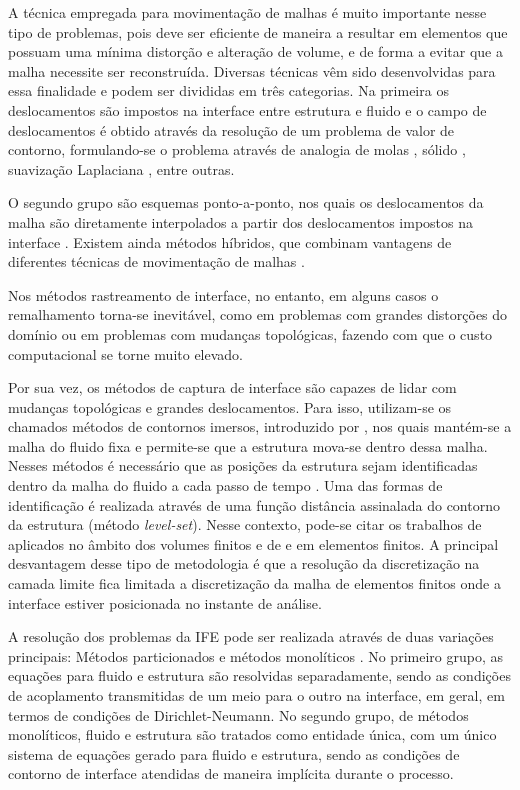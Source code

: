 \documentclass[tese_patricia.tex]{subfiles}
\begin{document}
A técnica empregada para movimentação de malhas é muito importante nesse tipo de problemas, pois deve ser eficiente de maneira a resultar em elementos que possuam uma mínima distorção e alteração de volume, e de forma a evitar que a malha necessite ser reconstruída. Diversas técnicas vêm sido desenvolvidas para essa finalidade e podem ser divididas em três categorias. Na primeira os deslocamentos são impostos na interface entre estrutura e fluido e o campo de deslocamentos é obtido através da resolução de um problema de valor de contorno, formulando-se o problema através de analogia de molas \cite{BottassoDS:2005}, sólido \cite{JohnsonT:1994,SteinTB:2004}, suavização Laplaciana \cite{KanchiM:2007}, entre outras.

O segundo grupo são esquemas ponto-a-ponto, nos quais os deslocamentos da malha são diretamente interpolados a partir dos deslocamentos impostos na interface \cite{DoneaGH:1982,TezduyarABJ:1993,SanchesC:2014}. Existem ainda métodos híbridos, que combinam vantagens de diferentes técnicas de movimentação de malhas \cite{Lefrancois:2008,FernandesCS:2019}. 

Nos métodos rastreamento de interface, no entanto, em alguns casos o remalhamento torna-se inevitável, como em problemas com grandes distorções do domínio ou em problemas com mudanças topológicas, fazendo com que o custo computacional se torne muito elevado.

Por sua vez, os métodos de captura de interface são capazes de lidar com mudanças topológicas e grandes deslocamentos. Para isso, utilizam-se os chamados métodos de contornos imersos, introduzido por , nos quais mantém-se a malha do fluido fixa e permite-se que a estrutura mova-se dentro dessa malha. Nesses métodos é necessário que as posições da estrutura sejam identificadas dentro da malha do fluido a cada passo de tempo \cite{MittalI:2005,WangRGF:2011}. Uma das formas de identificação é realizada através de uma função distância assinalada do contorno da estrutura (método \textit{level-set}). Nesse contexto, pode-se citar os trabalhos de   aplicados no âmbito dos volumes finitos e de  e  em elementos finitos. A principal desvantagem desse tipo de metodologia é que a resolução da discretização na camada limite fica limitada a discretização da malha de elementos finitos onde a interface estiver posicionada no instante de análise.

A resolução dos problemas da IFE pode ser realizada através de duas variações principais: Métodos particionados \cite{RouxG:2009,BazilevsHKWB:2011, SanchesC:2013,SanchesC:2014,FernandesCS:2019} e métodos monolíticos \cite{Blom:1998,Hubneretal:2004,HronM:2007,Avancini:2023}. No primeiro grupo, as equações para fluido e estrutura são resolvidas separadamente, sendo as condições de acoplamento transmitidas de um meio para o outro na interface, em geral, em termos de condições de Dirichlet-Neumann. No segundo grupo, de métodos monolíticos, fluido e estrutura são tratados como entidade única, com um único sistema de equações gerado para fluido e estrutura, sendo as condições de contorno de interface atendidas de maneira implícita durante o processo.
\end{document}
